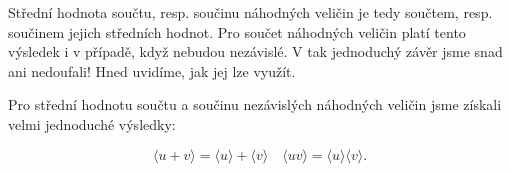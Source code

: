       Střední hodnota součtu, resp. součinu náhodných veličin je tedy součtem, resp. součinem jejich
      středních hodnot. Pro součet náhodných veličin platí tento výsledek i v případě, když nebudou
      nezávislé. V tak jednoduchý závěr jsme snad ani nedoufali! Hned uvidíme, jak jej lze využít.
      
      
      
      Pro střední hodnotu součtu a součinu nezávislých náhodných veličin jsme získali velmi
      jednoduché výsledky:
      
      \begin{mdframed}[style=highlight]
        \begin{equation}\label{mai:eq070}
          \langle u + v \rangle = \langle u \rangle + \langle v \rangle\quad
          \langle uv \rangle    = \langle u \rangle \langle v \rangle.
        \end{equation}
      \end{mdframed}
      
